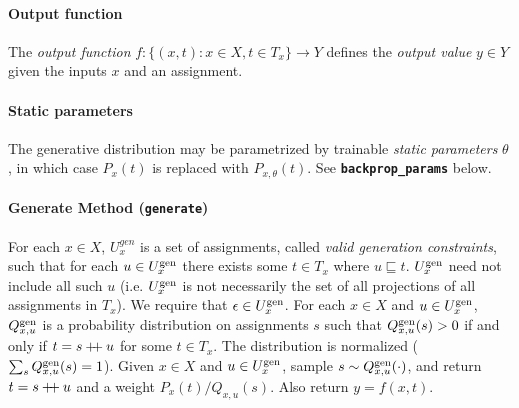 \documentclass{article}
\newcommand{\code}[1]{\texttt{\small{\textbf{#1}}}}
\newcommand\doubleplus{\mathbin{+\mkern-5mu+}}
\newcommand{\concat}[0]{\doubleplus}
\newcommand{\emptyassignment}[0]{\epsilon}
\newcommand{\gen}[0]{\mbox{\scriptsize gen}}
\newcommand{\contained}[0]{\sqsubseteq}
\begin{document}
\paragraph{Output function}
The \emph{output function} $f : \{(x, t) : x \in X, t \in T_x\} \to Y$ defines the \emph{output value} $y \in Y$ given the inputs $x$ and an assignment.

\paragraph{Static parameters}
The generative distribution may be parametrized by trainable \emph{static parameters} $\theta$, in which case $P_x(t)$ is replaced with $P_{x,\theta}(t)$.
See \code{backprop\_params} below.



\paragraph{Generate Method (\code{generate})}
For each $x \in X$, $U^{gen}_x$ is a set of assignments, called \emph{valid generation constraints}, such that for each $u \in U^{\gen}_x$ there exists some $t \in T_x$ where $u \contained t$.
$U^{\gen}_x$ need not include all such $u$ (i.e. $U^{\gen}_x$ is not necessarily the set of all projections of all assignments in $T_x$).
We require that $\emptyassignment \in U^{\gen}_x$.
For each $x \in X$ and $u \in U^{\gen}_x$, $Q^{\gen}_{x,u}$ is a probability distribution on assignments $s$ such that $Q^{\gen}_{x,u}(s) > 0$ if and only if $t = s \concat u$ for some $t \in T_x$.
The distribution is normalized ($\sum_s Q^{\gen}_{x,u}(s) = 1$).
Given $x \in X$ and $u \in U^{\gen}_x$, sample $s \sim Q^{\gen}_{x,u}(\cdot)$, and return $t = s \concat u$ and a weight $P_x(t) / Q_{x,u}(s)$.
Also return $y = f(x, t)$.
\end{document}
